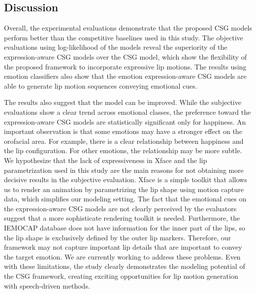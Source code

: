 \documentclass[10pt,journal,compsoc]{IEEEtran}
\begin{document}
\subsection{Discussion}
\label{sec:discussion}


Overall, the experimental evaluations demonstrate that the proposed CSG models perform better than the competitive baselines used in this study. The objective evaluations using log-likelihood of the models reveal the superiority of the expression-aware CSG models over the CSG model, which show the flexibility of the proposed framework to incorporate expressive lip motions. The results using emotion classifiers also show that the emotion expression-aware CSG models are able to generate lip motion sequences conveying emotional cues. 

The results also suggest that the model can be improved. While the  subjective evaluations show a clear trend across emotional classes, the preference toward the expression-aware CSG models are statistically significant only for happiness. An important observation is that some emotions may have a stronger effect on the orofacial area. For example, there is a clear relationship between happiness and the lip configuration. For other emotions, the relationship may be more subtle. We hypothesize that the lack of expressiveness in Xface and the lip parametrization used in this study are the main reasons for not obtaining more decisive results in the subjective evaluation. Xface is a simple toolkit that allows us to render an animation by parametrizing the lip shape using motion capture data, which simplifies our modeling setting. The fact that the emotional cues on the  expression-aware CSG models are not clearly perceived by the evaluators suggest that a more sophisticate rendering toolkit is needed. Furthermore, the IEMOCAP database does not have information for the inner part of the lips, so the lip shape is exclusively defined by the outer lip markers. Therefore, our framework may not capture important lip details that are important to convey the target emotion. We are currently working to address these problems. Even with these limitations, the study clearly demonstrates the modeling potential of the CSG framework, creating exciting opportunities for lip motion generation with speech-driven methods. 
\end{document}
